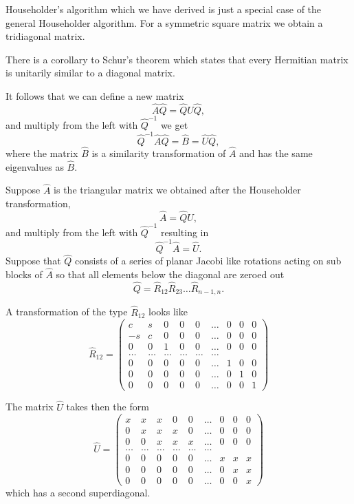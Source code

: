 \documentclass[%
oneside,                 %
final,                   %
10pt]{article}
\begin{document}
Householder's algorithm which we have derived is just a special case of the general Householder algorithm. For a symmetric square matrix we obtain a tridiagonal matrix. 

There is a corollary to Schur's theorem which states that every Hermitian matrix is unitarily similar to a diagonal matrix.

It follows that we can define a new matrix
\[
\hat{A}\hat{Q} = \hat{Q}\hat{U}\hat{Q},
\]
and multiply from the left with $\hat{Q}^{-1}$ we get
\[
\hat{Q}^{-1}\hat{A}\hat{Q} = \hat{B}=\hat{U}\hat{Q},
\]
where the matrix $\hat{B}$ is a similarity transformation of $\hat{A}$ and has the same eigenvalues
as $\hat{B}$. 

Suppose $\hat{A}$ is the triangular matrix we obtained after the Householder  transformation,
\[
\hat{A} = \hat{Q}\hat{U},
\]
and multiply from the left with $\hat{Q}^{-1}$ resulting in
\[
\hat{Q}^{-1}\hat{A} = \hat{U}.
\]
Suppose that $\hat{Q}$ consists of a series of planar Jacobi like rotations acting on sub blocks
of $\hat{A}$ so that all elements below the diagonal are zeroed out
\[
\hat{Q}=\hat{R}_{12}\hat{R}_{23}\dots\hat{R}_{n-1,n}.
\]

A transformation of the type $\hat{R}_{12}$ looks like
\[
 \hat{R}_{12} =
      \left( \begin{array}{ccccccccc} 
                 c&s &0 &0 &0 &  \dots &0 & 0 & 0\\
                 -s&c &0 &0 &0 &   \dots &0 & 0 & 0\\
                 0&0 &1 &0 &0 &   \dots &0 & 0 & 0\\
                 \dots&\dots &\dots &\dots &\dots &\dots      \\
                 0&0 &0 & 0 & 0 & \dots &1 &0 &0      \\
                 0&0 &0 & 0 & 0 & \dots &0 &1 &0      \\
                 0&0 &0 & 0 & 0 & \dots &0 &0 & 1  
             \end{array} \right)
\]

The matrix $\hat{U}$ takes then the form
\[
 \hat{U} =
      \left( \begin{array}{ccccccccc} 
                 x&x &x &0 &0 &  \dots &0 & 0 & 0\\
                 0&x &x &x &0 &   \dots &0 & 0 & 0\\
                 0&0 &x &x &x &   \dots &0 & 0 & 0\\
                 \dots&\dots &\dots &\dots &\dots &\dots      \\
                 0&0 &0 & 0 & 0 & \dots &x &x &x      \\
                 0&0 &0 & 0 & 0 & \dots &0 &x &x      \\
                 0&0 &0 & 0 & 0 & \dots &0 &0 & x  
             \end{array} \right)
\]
which has a second superdiagonal.
\end{document}
